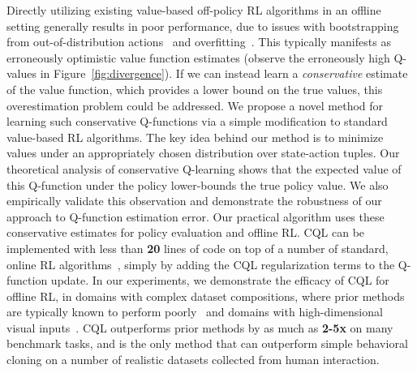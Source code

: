 Directly utilizing existing value-based off-policy RL algorithms in an offline setting generally results in poor performance, due to issues with bootstrapping from out-of-distribution actions~\citep{kumar2019stabilizing,fujimoto2018off} and overfitting~\citep{fu2019diagnosing,kumar2019stabilizing,agarwal2019optimistic}. This typically manifests as erroneously optimistic value function estimates (observe the erroneously high Q-values in Figure~\ref{fig:divergence}). If we can instead learn a \emph{conservative} estimate of the value function, which provides a lower bound on the true values, this overestimation problem could be addressed. We propose a novel method for learning such conservative Q-functions via a simple modification to standard value-based RL algorithms. The key idea behind our method is to minimize values under an appropriately chosen distribution over state-action tuples. Our theoretical analysis of conservative Q-learning shows that the expected value of this Q-function under the policy lower-bounds the true policy value. We also empirically validate this observation and demonstrate the robustness of our approach to Q-function estimation error. Our practical algorithm uses these conservative estimates for policy evaluation and offline RL. CQL can be implemented with less than \textbf{20} lines of code on top of a number of standard, online RL algorithms~\citep{haarnoja,dabney2018distributional}, simply by adding the CQL regularization terms to the Q-function update. In our experiments, we demonstrate the efficacy of CQL for offline RL, in domains with complex dataset compositions, where prior methods are typically known to perform poorly~\citep{d4rl} and domains with high-dimensional visual inputs~\citep{bellemare2013arcade,agarwal2019optimistic}. CQL outperforms prior methods by as much as \textbf{2-5x} on many benchmark tasks, and is the only method that can outperform simple behavioral cloning on a number of realistic datasets collected from human interaction.
